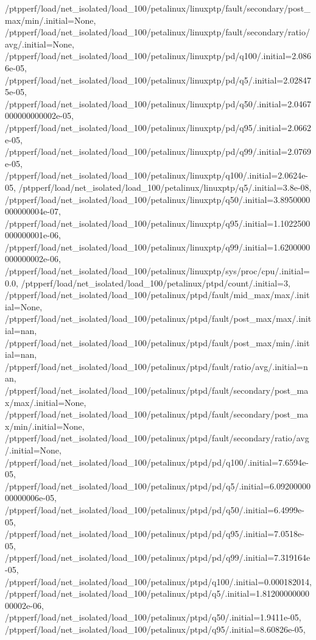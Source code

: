 {    /ptpperf/load/net_isolated/load_100/petalinux/linuxptp/fault/secondary/post_max/min/.initial=None,
    /ptpperf/load/net_isolated/load_100/petalinux/linuxptp/fault/secondary/ratio/avg/.initial=None,
    /ptpperf/load/net_isolated/load_100/petalinux/linuxptp/pd/q100/.initial=2.0866e-05,
    /ptpperf/load/net_isolated/load_100/petalinux/linuxptp/pd/q5/.initial=2.028475e-05,
    /ptpperf/load/net_isolated/load_100/petalinux/linuxptp/pd/q50/.initial=2.0467000000000002e-05,
    /ptpperf/load/net_isolated/load_100/petalinux/linuxptp/pd/q95/.initial=2.0662e-05,
    /ptpperf/load/net_isolated/load_100/petalinux/linuxptp/pd/q99/.initial=2.0769e-05,
    /ptpperf/load/net_isolated/load_100/petalinux/linuxptp/q100/.initial=2.0624e-05,
    /ptpperf/load/net_isolated/load_100/petalinux/linuxptp/q5/.initial=3.8e-08,
    /ptpperf/load/net_isolated/load_100/petalinux/linuxptp/q50/.initial=3.8950000000000004e-07,
    /ptpperf/load/net_isolated/load_100/petalinux/linuxptp/q95/.initial=1.1022500000000001e-06,
    /ptpperf/load/net_isolated/load_100/petalinux/linuxptp/q99/.initial=1.6200000000000002e-06,
    /ptpperf/load/net_isolated/load_100/petalinux/linuxptp/sys/proc/cpu/.initial=0.0,
    /ptpperf/load/net_isolated/load_100/petalinux/ptpd/count/.initial=3,
    /ptpperf/load/net_isolated/load_100/petalinux/ptpd/fault/mid_max/max/.initial=None,
    /ptpperf/load/net_isolated/load_100/petalinux/ptpd/fault/post_max/max/.initial=nan,
    /ptpperf/load/net_isolated/load_100/petalinux/ptpd/fault/post_max/min/.initial=nan,
    /ptpperf/load/net_isolated/load_100/petalinux/ptpd/fault/ratio/avg/.initial=nan,
    /ptpperf/load/net_isolated/load_100/petalinux/ptpd/fault/secondary/post_max/max/.initial=None,
    /ptpperf/load/net_isolated/load_100/petalinux/ptpd/fault/secondary/post_max/min/.initial=None,
    /ptpperf/load/net_isolated/load_100/petalinux/ptpd/fault/secondary/ratio/avg/.initial=None,
    /ptpperf/load/net_isolated/load_100/petalinux/ptpd/pd/q100/.initial=7.6594e-05,
    /ptpperf/load/net_isolated/load_100/petalinux/ptpd/pd/q5/.initial=6.0920000000000006e-05,
    /ptpperf/load/net_isolated/load_100/petalinux/ptpd/pd/q50/.initial=6.4999e-05,
    /ptpperf/load/net_isolated/load_100/petalinux/ptpd/pd/q95/.initial=7.0518e-05,
    /ptpperf/load/net_isolated/load_100/petalinux/ptpd/pd/q99/.initial=7.319164e-05,
    /ptpperf/load/net_isolated/load_100/petalinux/ptpd/q100/.initial=0.000182014,
    /ptpperf/load/net_isolated/load_100/petalinux/ptpd/q5/.initial=1.8120000000000002e-06,
    /ptpperf/load/net_isolated/load_100/petalinux/ptpd/q50/.initial=1.9411e-05,
    /ptpperf/load/net_isolated/load_100/petalinux/ptpd/q95/.initial=8.60826e-05,
}
